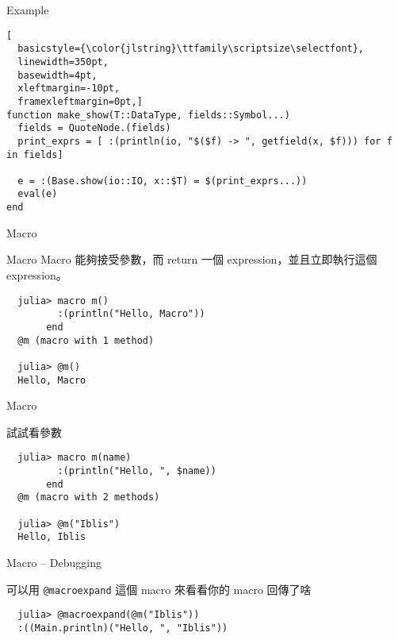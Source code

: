 \documentclass[14pt]{beamer}
\begin{document}
\begin{frame}[fragile]{Example}

\begin{lstlisting}[
  basicstyle={\color{jlstring}\ttfamily\scriptsize\selectfont},
  linewidth=350pt,
  basewidth=4pt,
  xleftmargin=-10pt,
  framexleftmargin=0pt,]
function make_show(T::DataType, fields::Symbol...)
  fields = QuoteNode.(fields)
  print_exprs = [ :(println(io, "$($f) -> ", getfield(x, $f))) for f in fields]

  e = :(Base.show(io::IO, x::$T) = $(print_exprs...))
  eval(e)
end
\end{lstlisting}
\end{frame}


\begin{frame}[c]{}
  \centering
  \huge
  Macro
\end{frame}


\begin{frame}[fragile]{Macro}
  Macro 能夠接受參數，而 return 一個 expression，並且\alert{立即執行}這個 expression。

  \pause

\begin{lstlisting}
  julia> macro m()
         :(println("Hello, Macro"))
       end
  @m (macro with 1 method)

  julia> @m()
  Hello, Macro
\end{lstlisting}
\end{frame}


\begin{frame}[fragile]{Macro}

  試試看參數

\begin{lstlisting}
  julia> macro m(name)
         :(println("Hello, ", $name))
       end
  @m (macro with 2 methods)

  julia> @m("Iblis")
  Hello, Iblis
\end{lstlisting}
\end{frame}


\begin{frame}[fragile]{Macro -- Debugging}

  可以用 \texttt{@macroexpand} 這個 macro 來看看你的 macro 回傳了啥

\begin{lstlisting}
  julia> @macroexpand(@m("Iblis"))
  :((Main.println)("Hello, ", "Iblis"))
\end{lstlisting}
\end{frame}
\end{document}
